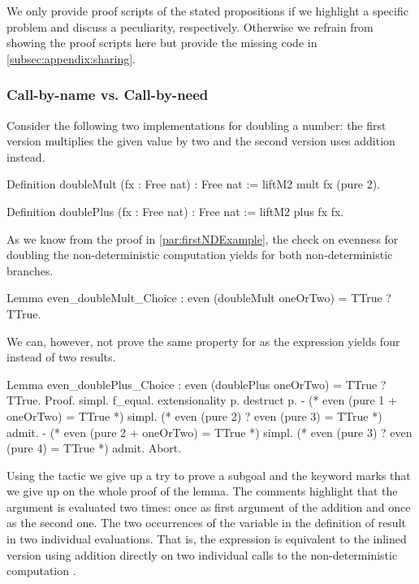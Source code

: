 We only provide proof scripts of the stated propositions if we highlight a specific problem and discuss a peculiarity, respectively.
Otherwise we refrain from showing the proof scripts here but provide the missing code in \autoref{subsec:appendix:sharing}.

\subsubsection{Call\--by\--name vs. Call\--by\--need}
\label{subsubsec:cbneed}
 
Consider the following two implementations for doubling a number: the first version multiplies the given value by two and the second version uses addition instead.

\begin{coqcode}
Definition doubleMult (fx : Free nat) : Free nat :=
  liftM2 mult fx (pure 2).

Definition doublePlus (fx : Free nat) : Free nat :=
  liftM2 plus fx fx.
\end{coqcode}

As we know from the proof in \autoref{par:firstNDExample}, the check on evenness for doubling the non\--deterministic computation  yields  for both non\--deterministic branches.

\begin{coqcode}
Lemma even_doubleMult_Choice :
  even (doubleMult oneOrTwo) = TTrue ? TTrue.
\end{coqcode}

We can, however, not prove the same property for  as the expression yields four instead of two results.

\begin{coqcode}
Lemma even_doublePlus_Choice :
 even (doublePlus oneOrTwo) = TTrue ? TTrue.
Proof.
  simpl. f_equal. extensionality p.
  destruct p.
  - (* even (pure 1 + oneOrTwo) = TTrue *)
    simpl.
    (* even (pure 2) ? even (pure 3) = TTrue *)
    admit.
  - (* even (pure 2 + oneOrTwo) = TTrue *)
    simpl.
    (* even (pure 3) ? even (pure 4) = TTrue *)
    admit.
Abort.
\end{coqcode}

Using the tactic  we give up a try to prove a subgoal and the keyword  marks that we give up on the whole proof of the lemma.
The comments highlight that the argument  is evaluated two times: once as first argument of the addition and once as the second one.
The two occurrences of the variable  in the definition of  result in two individual evaluations.
That is, the expression is equivalent to the inlined version using addition directly on two individual calls to the non\--deterministic computation .

